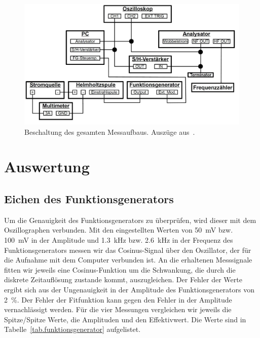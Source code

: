\documentclass[paper=a4,
	fontsize=10pt,
	DIV=18,
	twocolumn,
	parskip=half
	]{scrartcl}
\numberwithin{equation}{section}    %
\begin{document}
\begin{figure}[htp]
	\includegraphics[width=\columnwidth]{Bilder/messbeschaltung.pdf}
	\caption{Beschaltung des gesamten Messaufbaus. Auszüge aus~\citet{anleitung}.}
	\label{fig.beschaltung}
\end{figure}

%
\section{Auswertung}
\label{auswertung}
%
\subsection{Eichen des Funktionsgenerators}
\label{auswertung1}

Um die Genauigkeit des Funktionsgenerators zu überprüfen, wird dieser mit dem Oszillographen verbunden. Mit den eingestellten Werten von \SI{50}{\milli\volt} bzw. \SI{100}{\milli\volt} in der Amplitude und \SI{1.3}{\kilo\hertz} bzw. \SI{2.6}{\kilo\hertz} in der Frequenz des Funktionsgenerators messen wir das Cosinus-Signal über den Oszillator, der für die Aufnahme mit dem Computer verbunden ist. An die erhaltenen Messsignale fitten wir jeweils eine Cosinus-Funktion um die Schwankung, die durch die diskrete Zeitauflösung zustande kommt, auszugleichen. Der Fehler der Werte ergibt sich aus der Ungenauigkeit in der Amplitude des Funktionsgenerators von \SI{2}{\percent}. Der Fehler der Fitfunktion kann gegen den Fehler in der Amplitude vernachlässigt werden. Für die vier Messungen vergleichen wir jeweils die Spitze/Spitze Werte, die Amplituden und den Effektivwert. Die Werte sind in Tabelle~\ref{tab.funktionsgenerator} aufgelistet.
\end{document}
